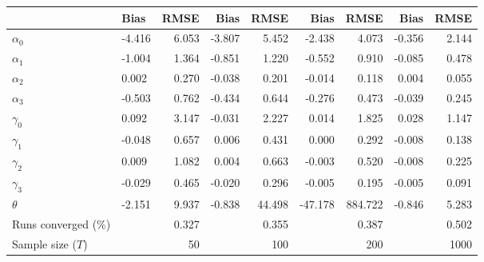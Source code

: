 
\begin{tabular}[t]{llrrrrrrr}
\toprule
  & Bias & RMSE & Bias & RMSE & Bias & RMSE & Bias & RMSE\\
\midrule
$\alpha_{0}$ & -4.416 & 6.053 & -3.807 & 5.452 & -2.438 & 4.073 & -0.356 & 2.144\\
$\alpha_{1}$ & -1.004 & 1.364 & -0.851 & 1.220 & -0.552 & 0.910 & -0.085 & 0.478\\
$\alpha_{2}$ & 0.002 & 0.270 & -0.038 & 0.201 & -0.014 & 0.118 & 0.004 & 0.055\\
$\alpha_{3}$ & -0.503 & 0.762 & -0.434 & 0.644 & -0.276 & 0.473 & -0.039 & 0.245\\
$\gamma_{0}$ & 0.092 & 3.147 & -0.031 & 2.227 & 0.014 & 1.825 & 0.028 & 1.147\\
$\gamma_{1}$ & -0.048 & 0.657 & 0.006 & 0.431 & 0.000 & 0.292 & -0.008 & 0.138\\
$\gamma_{2}$ & 0.009 & 1.082 & 0.004 & 0.663 & -0.003 & 0.520 & -0.008 & 0.225\\
$\gamma_{3}$ & -0.029 & 0.465 & -0.020 & 0.296 & -0.005 & 0.195 & -0.005 & 0.091\\
$\theta$ & -2.151 & 9.937 & -0.838 & 44.498 & -47.178 & 884.722 & -0.846 & 5.283\\
Runs converged (\%) &  & 0.327 &  & 0.355 &  & 0.387 &  & 0.502\\
Sample size ($T$) &  & 50 &  & 100 &  & 200 &  & 1000\\
\bottomrule
\end{tabular}
